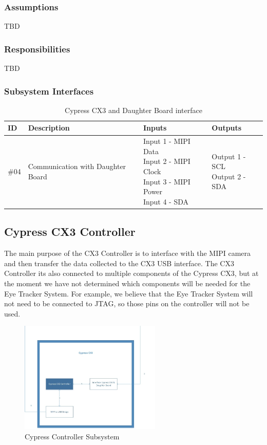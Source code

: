 \subsubsection{Assumptions}
TBD

\subsubsection{Responsibilities}
TBD

\subsubsection{Subsystem Interfaces}

\begin {table}[H]
\caption {Cypress CX3 and Daughter Board interface}
\begin{center}
    \begin{tabular}{ | p{1cm} | p{6cm} | p{3cm} | p{3cm} |}
    \hline
    ID & Description & Inputs & Outputs \\ \hline
    \#04 & Communication with Daughter Board & \pbox{3cm}{Input 1 - MIPI Data \\ Input 2 - MIPI Clock \\ Input 3 - MIPI Power \\ Input 4 - SDA} & \pbox{3cm}{Output 1 - SCL \\ Output 2 - SDA}  \\ \hline
    \end{tabular}
\end{center}
\end{table}

\subsection{Cypress CX3 Controller}
The main purpose of the CX3 Controller is to interface with the MIPI camera and then transfer the data collected to the CX3 USB interface. The CX3 Controller its also connected to multiple components of the Cypress CX3, but at the moment we have not determined which components will be needed for the Eye Tracker System. For example, we believe that the Eye Tracker System will not need to be connected to JTAG, so those pins on the controller will not be used.

\begin{figure}[h!]
	\centering
 	\includegraphics[width=0.60\textwidth]{images/Cypress_Controller}
 \caption{Cypress Controller Subsystem}
\end{figure}

